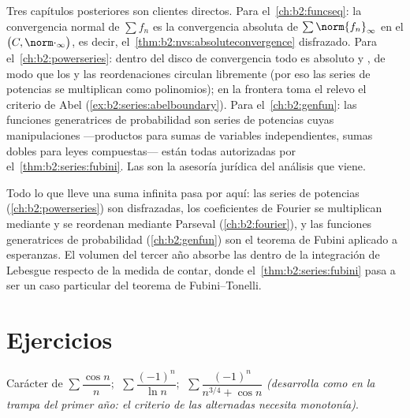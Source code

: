 \begin{remark}\label{rem:b2:series:perspectives}
Tres capítulos posteriores son clientes directos. Para el~\cref{ch:b2:funcseq}: la convergencia normal de $\sum f_n$ es la
convergencia absoluta de $\sum\norm{f_n}_\infty$ en el
 $\bigl(C, \norm\cdot_\infty\bigr)$, es decir, el~\cref{thm:b2:nvs:absoluteconvergence} disfrazado. Para el~\cref{ch:b2:powerseries}: dentro del disco de convergencia todo es
absoluto y , de modo que los  y las
reordenaciones circulan libremente (por eso las series de potencias
se multiplican como polinomios); en la frontera toma el relevo el
criterio de Abel (\cref{ex:b2:series:abelboundary}). Para el~\cref{ch:b2:genfun}: las funciones generatrices de probabilidad son
series de potencias cuyas manipulaciones ---productos para sumas de
variables independientes, sumas dobles para leyes compuestas---
están todas autorizadas por el~\cref{thm:b2:series:fubini}. Las
 son la asesoría jurídica del análisis que viene.
\end{remark}

\begin{remark}
Todo lo que lleve una suma infinita pasa por aquí: las series de
potencias (\cref{ch:b2:powerseries}) son 
disfrazadas, los coeficientes de Fourier se multiplican mediante
 y se reordenan mediante Parseval
(\cref{ch:b2:fourier}), y las funciones generatrices de
probabilidad (\cref{ch:b2:genfun}) son el teorema de Fubini
aplicado a esperanzas. El volumen del tercer año absorbe las
 dentro de la integración de Lebesgue respecto de
la medida de contar, donde el~\cref{thm:b2:series:fubini} pasa a ser
un caso particular del teorema de Fubini--Tonelli.
\end{remark}

\section{Ejercicios}

\begin{exercise}[$\star$]\label{exo:b2:series:1}
Carácter de $\sum \dfrac{\cos n}{n}$; $\;\sum \dfrac{(-1)^n}{\ln
n}$; $\;\sum \dfrac{(-1)^n}{n^{3/4} + \cos n}$ \emph{(desarrolla
como en la trampa del primer año: el criterio de las alternadas
necesita monotonía)}.
\end{exercise}

